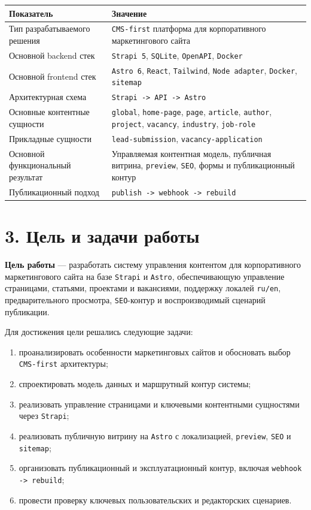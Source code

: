\documentclass[12pt,a4paper]{article}
\begin{document}
\begin{longtable}{|p{5.0cm}|p{9.0cm}|}
\hline
\textbf{Показатель} & \textbf{Значение} \\
\hline
Тип разрабатываемого решения & \texttt{CMS-first} платформа для корпоративного маркетингового сайта \\
\hline
Основной backend стек & \texttt{Strapi 5}, \texttt{SQLite}, \texttt{OpenAPI}, \texttt{Docker} \\
\hline
Основной frontend стек & \texttt{Astro 6}, \texttt{React}, \texttt{Tailwind}, \texttt{Node adapter}, \texttt{Docker}, \texttt{sitemap} \\
\hline
Архитектурная схема & \texttt{Strapi -> API -> Astro} \\
\hline
Основные контентные сущности & \texttt{global}, \texttt{home-page}, \texttt{page}, \texttt{article}, \texttt{author}, \texttt{project}, \texttt{vacancy}, \texttt{industry}, \texttt{job-role} \\
\hline
Прикладные сущности & \texttt{lead-submission}, \texttt{vacancy-application} \\
\hline
Основной функциональный результат & Управляемая контентная модель, публичная витрина, \texttt{preview}, \texttt{SEO}, формы и публикационный контур \\
\hline
Публикационный подход & \texttt{publish -> webhook -> rebuild} \\
\hline
\end{longtable}

\section*{3. Цель и задачи работы}

\textbf{Цель работы} --- разработать систему управления контентом для корпоративного
маркетингового сайта на базе \texttt{Strapi} и \texttt{Astro}, обеспечивающую управление
страницами, статьями, проектами и вакансиями, поддержку локалей \texttt{ru/en},
предварительного просмотра, \texttt{SEO}-контур и воспроизводимый сценарий публикации.

Для достижения цели решались следующие задачи:
\begin{enumerate}
  \item проанализировать особенности маркетинговых сайтов и обосновать выбор
  \texttt{CMS-first} архитектуры;
  \item спроектировать модель данных и маршрутный контур системы;
  \item реализовать управление страницами и ключевыми контентными сущностями через
  \texttt{Strapi};
  \item реализовать публичную витрину на \texttt{Astro} с локализацией, \texttt{preview},
  \texttt{SEO} и \texttt{sitemap};
  \item организовать публикационный и эксплуатационный контур, включая
  \texttt{webhook -> rebuild};
  \item провести проверку ключевых пользовательских и редакторских сценариев.
\end{enumerate}
\end{document}

